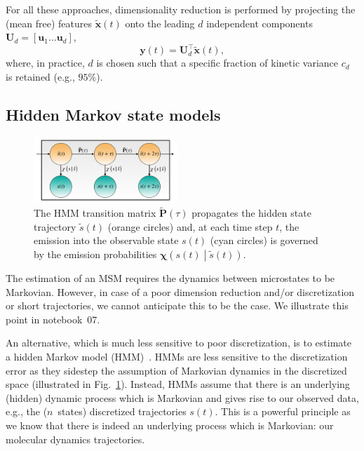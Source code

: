 \documentclass[9pt,tutorial]{livecoms}
\begin{document}
For all these approaches,
dimensionality reduction is performed by projecting the (mean free) features $\tilde{\mathbf{x}}(t)$
onto the leading $d$ independent components $\mathbf{U}_d=\left[\mathbf{u}_1 \dots \mathbf{u}_d\right]$,
\begin{equation}
\mathbf{y}(t) = \mathbf{U}_d^\top \tilde{\mathbf{x}}(t),
\end{equation}
where, in practice, $d$ is chosen such that a specific fraction of kinetic variance $c_d$ is retained (e.g., $95\%$).

\subsection{Hidden Markov state models}

\begin{figure}
\includegraphics[width=0.48\textwidth]{figure_1}
\caption{The HMM transition matrix $\tilde{\mathbf{P}}(\tau)$ propagates the hidden state trajectory $\tilde{s}(t)$ (orange circles) and, at each time step $t$, the emission into the observable state $s(t)$ (cyan circles) is governed by the emission probabilities $\bm{\chi}\left( s(t) \middle| \tilde{s}(t) \right)$.}
\label{fig:hmm-scheme}
\end{figure}

The estimation of an MSM requires the dynamics between microstates to be Markovian.
However, in case of a poor dimension reduction and/or discretization or short trajectories,
we cannot anticipate this to be the case.
We illustrate this point in notebook~07.

An alternative, which is much less sensitive to poor discretization,
is to estimate a hidden Markov model (HMM)~\cite{hmm-baum-welch-alg,hmm-tutorial,jhp-spectral-rate-theory,noe-proj-hid-msm,bhmm-preprint}.
HMMs are less sensitive to the discretization error as they sidestep the assumption of Markovian dynamics in the discretized space (illustrated in Fig.~\ref{fig:hmm-scheme}).
Instead, HMMs assume that there is an underlying (hidden) dynamic process which is Markovian
and gives rise to our observed data, e.g., the ($n$~states) discretized trajectories $s(t)$.
This is a powerful principle as we know that there is indeed an underlying process which is Markovian:
our molecular dynamics trajectories.
\end{document}
